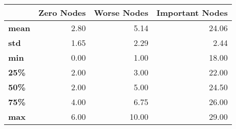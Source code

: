 \begin{tabular}{lrrr}
\toprule
{} &  Zero Nodes &  Worse Nodes &  Important Nodes \\
\midrule
\textbf{mean} &        2.80 &         5.14 &            24.06 \\
\textbf{std } &        1.65 &         2.29 &             2.44 \\
\textbf{min } &        0.00 &         1.00 &            18.00 \\
\textbf{25\% } &        2.00 &         3.00 &            22.00 \\
\textbf{50\% } &        2.00 &         5.00 &            24.50 \\
\textbf{75\% } &        4.00 &         6.75 &            26.00 \\
\textbf{max } &        6.00 &        10.00 &            29.00 \\
\bottomrule
\end{tabular}

